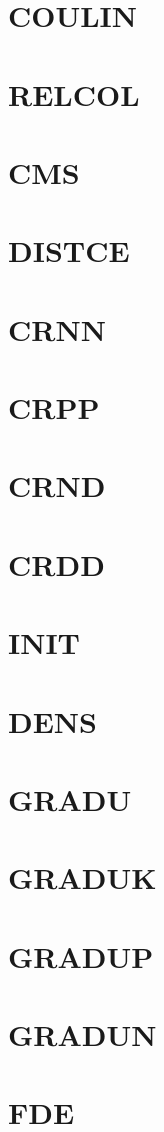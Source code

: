 \documentclass[10pt,UTF8]{ctexbook}
\begin{document}
\section{COULIN}
\section{RELCOL}
\section{CMS}
\section{DISTCE}
\section{CRNN}
\section{CRPP}
\section{CRND}
\section{CRDD}
\section{INIT}
\section{DENS}
\section{GRADU}
\section{GRADUK}
\section{GRADUP}
\section{GRADUN}
\section{FDE}
\end{document}
